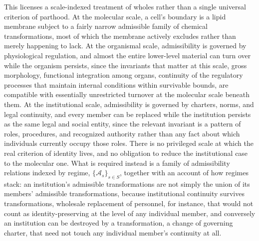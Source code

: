 \documentclass[11pt]{article}
\begin{document}
This licenses a scale-indexed treatment of wholes rather than a single universal criterion of parthood. At the molecular scale, a cell's boundary is a lipid membrane subject to a fairly narrow admissible family of chemical transformations, most of which the membrane actively excludes rather than merely happening to lack. At the organismal scale, admissibility is governed by physiological regulation, and almost the entire lower-level material can turn over while the organism persists, since the invariants that matter at this scale, gross morphology, functional integration among organs, continuity of the regulatory processes that maintain internal conditions within survivable bounds, are compatible with essentially unrestricted turnover at the molecular scale beneath them. At the institutional scale, admissibility is governed by charters, norms, and legal continuity, and every member can be replaced while the institution persists as the same legal and social entity, since the relevant invariant is a pattern of roles, procedures, and recognized authority rather than any fact about which individuals currently occupy those roles. There is no privileged scale at which the real criterion of identity lives, and no obligation to reduce the institutional case to the molecular one. What is required instead is a family of admissibility relations indexed by regime, $\{\mathcal{A}_s\}_{s \in S}$, together with an account of how regimes stack: an institution's admissible transformations are not simply the union of its members' admissible transformations, because institutional continuity survives transformations, wholesale replacement of personnel, for instance, that would not count as identity-preserving at the level of any individual member, and conversely an institution can be destroyed by a transformation, a change of governing charter, that need not touch any individual member's continuity at all.
\end{document}
